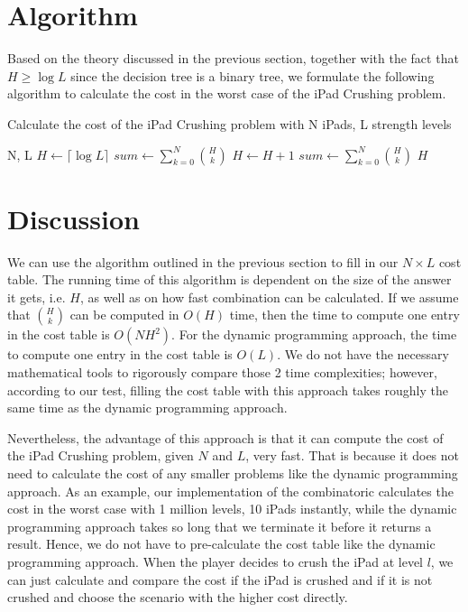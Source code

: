 \documentclass[12pt,a4paper,oneside]{report}
\begin{document}
\section{Algorithm}
Based on the theory discussed in the previous section, together with the fact that $H \geq \log L$ since the decision tree is a binary tree, we formulate the following algorithm to calculate the cost in the worst case of the iPad Crushing problem.

\begin{algorithm}
        \caption{Calculate the cost of the iPad Crushing problem with N iPads, L strength levels}
        \begin{algorithmic}[1]
            \REQUIRE N, L
	\STATE $H \leftarrow \lceil \log L\rceil$
	\STATE $sum \leftarrow \sum_{k=0}^{N} {H \choose k}$
		\STATE $H \leftarrow H+1$
		\STATE $sum \leftarrow \sum_{k=0}^{N} {H \choose k}$
	\ENDWHILE
	\RETURN $H$
        \end{algorithmic}
\end{algorithm}

\section{Discussion}
We can use the algorithm outlined in the previous section to fill in our $N \times L$ cost table. The running time of this algorithm is dependent on the size of the answer it gets, i.e. $H$, as well as on how fast combination can be calculated. If we assume that ${H \choose k}$ can be computed in $O(H)$ time, then the time to compute one entry in the cost table is $O(NH^2)$. For the dynamic programming approach, the time to compute one entry in the cost table is $O(L)$. We do not have the necessary mathematical tools to rigorously compare those 2 time complexities; however, according to our test, filling the cost table with this approach takes roughly the same time as the dynamic programming approach.

Nevertheless, the advantage of this approach is that it can compute the cost of the iPad Crushing problem, given $N$ and $L$, very fast. That is because it does not need to calculate the cost of any smaller problems like the dynamic programming approach.  As an example, our implementation of the combinatoric calculates the cost in the worst case with 1 million levels, 10 iPads instantly, while the dynamic programming approach takes so long that we terminate it before it returns a result. Hence, we do not have to pre-calculate the cost table like the dynamic programming approach. When the player decides to crush the iPad at level $l$, we can just calculate and compare the cost if the iPad is crushed and if it is not crushed and choose the scenario with the higher cost directly.
\end{document}
